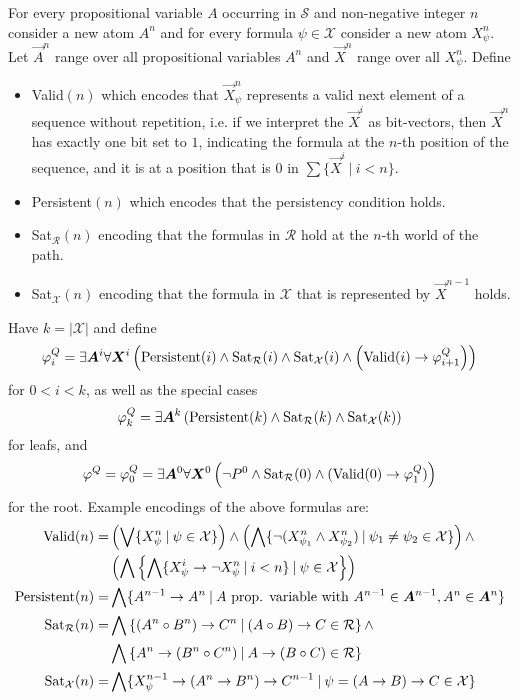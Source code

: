 \documentclass[runningheads]{llncs}
\begin{document}
\begin{definition}
	For every propositional variable $A$ occurring in $\mathcal S$ and non-negative integer $n$ consider a new atom $A^n$ and for every formula $\psi\in\mathcal X$ consider a new atom $X_\psi^n$. Let $\vec A^n$ range over all propositional variables $A^n$ and $\vec X^n$ range over all $X_\psi^n$. Define
	\begin{itemize}
		\item {\normalfont Valid}$(n)$ which encodes that $\vec X^n_\psi$ represents a valid next element of a sequence without repetition, i.e. if we interpret the $\vec X^i$ as bit-vectors, then $\vec X^n$ has exactly one bit set to $1$, indicating the formula at the $n$-th position of the sequence, and it is at a position that is $0$ in $\sum\{\vec X^i\:|\:i < n\}$.
		\item {\normalfont Persistent}$(n)$ which encodes that the persistency condition holds.
		\item {\normalfont Sat}$_{\mathcal R}(n)$ encoding that the formulas in $\mathcal R$ hold at the $n$-th world of the path.
		\item {\normalfont Sat}$_{\mathcal X}(n)$ encoding that the formula in $\mathcal X$ that is represented by $\vec X^{n-1}$ holds.
	\end{itemize}
	Have $k = |\mathcal X|$ and define$$\varphi^Q_{i} = \exists \vec A^i\forall \vec X^i\left(\text{\normalfont Persistent}(i)\wedge \text{\normalfont Sat}_{\mathcal R}(i)\wedge \text{\normalfont Sat}_{\mathcal X}(i)\wedge\left(\text{\normalfont Valid}(i)\to \varphi^Q_{i+1}\right)\right)$$
	for $0 < i < k$, as well as the special cases
	$$\varphi^Q_{k} = \exists \vec A^k\left(\text{\normalfont Persistent}(k)\wedge \text{\normalfont Sat}_{\mathcal R}(k)\wedge \text{\normalfont Sat}_{\mathcal X}(k)\right)$$
	for leafs, and $$\varphi^Q = \varphi_0^Q = \exists \vec A^0\forall \vec X^0\left(\neg P^0\wedge \text{\normalfont Sat}_{\mathcal R}(0)\wedge(\text{\normalfont Valid}(0)\to \varphi_1^Q)\right)$$for the root.
	Example encodings of the above formulas are:
	\begin{align*}
		\text{\normalfont Valid}(n) = &\left(\bigvee \{X^n_\psi\:|\:\psi\in\mathcal X\}\right)\wedge\left(\bigwedge \{\neg(X^n_{\psi_1}\wedge X^n_{\psi_2})\:|\:\psi_1\neq\psi_2\in\mathcal X\}\right)\wedge\\&\left(\bigwedge\left\{\bigwedge\{X^i_\psi\to\neg X^n_\psi\:|\:i < n\}\:|\:\psi\in\mathcal X\right\}\right)\\
		\text{\normalfont Persistent}(n) = & \bigwedge\{A^{n-1}\to A^n\:|\: A \text{ prop. variable with }A^{n-1}\in\vec A^{n-1}, A^n \in\vec A^{n}\}\\
		\text{\normalfont Sat}_{\mathcal R}(n) = &\bigwedge\left\{(A^n\circ B^n)\to C^n\:|\:(A\circ B)\to C\in \mathcal R\right\}\wedge\\
		&\bigwedge\left\{A^n\to (B^n\circ C^n)\:|\:A\to (B\circ C)\in \mathcal R\right\}\\
		\text{\normalfont Sat}_{\mathcal X}(n) = & \bigwedge\{X^{n-1}_\psi\to (A^n\to B^n)\to C^{n-1}\:|\:\psi = (A\to B)\to C\in\mathcal X\}
	\end{align*}
\end{definition}
\end{document}

